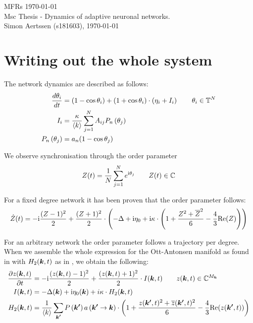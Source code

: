 


\mainmatter

MFRs \today \\
Msc Thesis - Dynamics of adaptive neuronal networks. \\
Simon Aertssen (s181603), \today \\ 

\section{Writing out the whole system}
The network dynamics are described as follows:
\begin{align}
\frac{d \theta_i}{d t} &= (1 - \cos\theta_i) + (1 + \cos\theta_i)\cdot\left(\eta_i + I_i \right) \qquad \theta_i \in {\mathbb{T}}^N \nonumber \\
I_{i} &= \frac{\kappa}{\langle k\rangle} \sum_{j=1}^{N} A_{i j} P_{n}\left(\theta_{j}\right) \label{eq:FullThetaNeuronNetwork} \\
P_{n}\left(\theta_{j}\right) &= a_n (1 - \cos\theta_j) \nonumber
\end{align}

We observe synchronisation through the order parameter
\begin{align}
Z(t) = \frac{1}{N} \sum_{j=1}^N e^{{\rm{i}}\theta_j}  \qquad Z(t) \in {\mathbb{C}} \label{eq:orderparameter}
\end{align}

For a fixed degree network it has been proven that the order parameter follows:
\begin{align}
\dot{Z}(t)= -{\rm{i}} \frac{(Z-1)^2}{2}+\frac{(Z+1)^2}{2} \cdot \left(-\Delta+ {\rm{i}}\eta_{0}
+ {\rm{i}} \kappa \cdot \left(1+\frac{Z^{2} + \overline{Z}^{2} }{6} - \frac{4}{3} {\operatorname{Re}}(Z)\right)\right) \label{eq:MeanField}
\end{align}
    
For an arbitrary network the order parameter follows a trajectory per degree. When we assemble the whole expression for the Ott-Antonsen manifold as found in \cite{OttAntonsen2017} with $H_2({\boldsymbol{k}},t)$ as in \cite{Martens2020}, we obtain the following:
\begin{align}
\frac{\partial z({\boldsymbol{k}}, t)}{\partial t} &= -{\rm{i}} \frac{(z({\boldsymbol{k}}, t)-1)^{2}}{2} + \frac{(z({\boldsymbol{k}}, t)+1)^{2}}{2} \cdot I({\boldsymbol{k}}, t) \qquad z({\boldsymbol{k}},t) \in {\mathbb{C}}^{M_{\boldsymbol{k}}} \nonumber \\
I({\boldsymbol{k}}, t) &= -\Delta({\boldsymbol{k}}) + {\rm{i}} \eta_{0}({\boldsymbol{k}}) + i \kappa \cdot H_2({\boldsymbol{k}},t) \label{eq:OttAntonsenSystemFull} \\
H_2({\boldsymbol{k}},t) &= \frac{1}{{\langle k\rangle}} \sum_{{\boldsymbol{k'}}} P\left({\boldsymbol{k'}}\right) a\left({\boldsymbol{k'}} \rightarrow {\boldsymbol{k}}\right) \cdot \left( 1 + \frac{z({\boldsymbol{k'}}, t)^2 + \overline{z}({\boldsymbol{k'}}, t)^2}{6} - \frac{4}{3} {\operatorname{Re}}(z({\boldsymbol{k'}}, t)) \right) \nonumber
\end{align}

